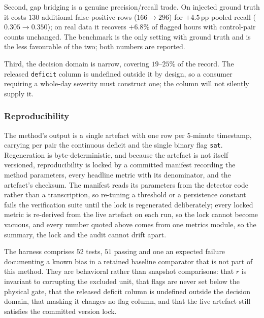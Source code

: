 Second, gap bridging is a genuine precision/recall trade. On injected ground truth it costs $130$ additional false-positive rows ($166 \rightarrow 296$) for $+4.5$\,pp pooled recall ($0.305 \rightarrow 0.350$); on real data it recovers $+6.8\%$ of flagged hours with control-pair counts unchanged. The benchmark is the only setting with ground truth and is the less favourable of the two; both numbers are reported.

Third, the decision domain is narrow, covering $19$--$25\%$ of the record. The released \texttt{deficit} column is undefined outside it by design, so a consumer requiring a whole-day severity must construct one; the column will not silently supply it.

\subsubsection{Reproducibility}
\label{sss:mppt_repro}

The method's output is a single artefact with one row per $5$-minute timestamp, carrying per pair the continuous deficit and the single binary flag \texttt{sat}. Regeneration is byte-deterministic, and because the artefact is not itself versioned, reproducibility is locked by a committed manifest recording the method parameters, every headline metric with its denominator, and the artefact's checksum. The manifest reads its parameters from the detector code rather than a transcription, so re-tuning a threshold or a persistence constant fails the verification suite until the lock is regenerated deliberately; every locked metric is re-derived from the live artefact on each run, so the lock cannot become vacuous, and every number quoted above comes from one metrics module, so the summary, the lock and the audit cannot drift apart.

The harness comprises $52$ tests, $51$ passing and one an expected failure documenting a known bias in a retained baseline comparator that is not part of this method. They are behavioral rather than snapshot comparisons: that $r$ is invariant to corrupting the excluded unit, that flags are never set below the physical gate, that the released deficit column is undefined outside the decision domain, that masking it changes no flag column, and that the live artefact still satisfies the committed version lock.
